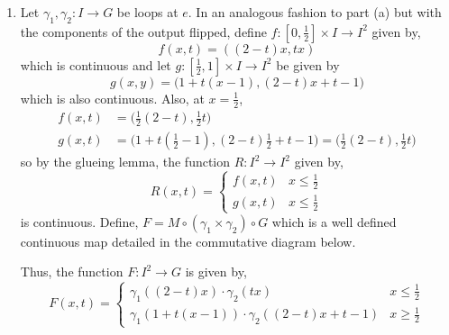 \documentclass[12pt]{extarticle}
\begin{document}
\begin{enumerate}
\item Let $\gamma_1, \gamma_2 : I \to G$ be loops at $e$. In an analogous fashion to part (a) but with the components of the output flipped, define $f : [0, \tfrac{1}{2}] \times I \to I^2$ given by, 
\[f(x, t) = ((2-t)x, tx)\]
which is continuous and let $g : [\tfrac{1}{2}, 1] \times I \to I^2$ be given by 
\[g(x,y) = \big(1 + t(x - 1), (2-t)x + t - 1 \big)\]
which is also continuous. Also, at $x = \frac{1}{2}$, 
\begin{align*}
f(x, t) & = \big(\tfrac{1}{2}(2-t), \tfrac{1}{2} t \big) \\
g(x, t) & = \big(1 + t(\tfrac{1}{2} - 1), (2 - t) \tfrac{1}{2} + t - 1 \big) = \big( \tfrac{1}{2}(2-t), \tfrac{1}{2} t \big)
\end{align*}
so by the glueing lemma, the function $R : I^2 \to I^2$ given by,
\[ R(x,t) = 
\begin{cases}
f(x,t) & x \le \frac{1}{2} \\
g(x,t) & x \le \frac{1}{2}
\end{cases}\]
is continuous. Define, $F = M \circ (\gamma_1 \times \gamma_2) \circ G$ which is a well defined continuous map detailed in the commutative diagram below.

\begin{center}
\end{center}   

Thus, the function $F : I^2 \to G$ is given by, 
\[F(x,t) = 
\begin{cases}
\gamma_1((2-t)x) \cdot \gamma_2(tx) & x \le \frac{1}{2} \\
\gamma_1(1 + t(x - 1)) \cdot \gamma_2((2-t)x + t - 1) & x \ge \frac{1}{2}
\end{cases}\]


\end{enumerate}
\end{document}
